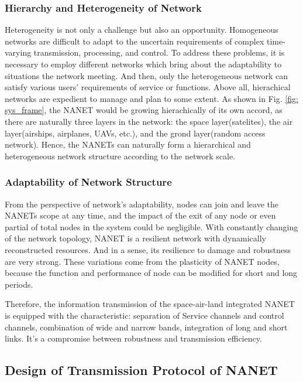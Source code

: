 \documentclass[journal,comsoc]{IEEEtran}
\begin{document}
			\subsubsection{Hierarchy and Heterogeneity of Network}
				Heterogeneity is not only a challenge but also an opportunity. 
				Homogeneous networks are difficult to adapt to the uncertain requirements of complex time-varying transmission, processing, and control.
				To address these problems, it is necessary to employ different networks which bring about the adaptability to situations the network meeting.	
				And then, only the heterogeneous network can satisfy various users' requirements of service or functions.
				Above all, hierachical networks are expedient to manage and plan to some extent.
				As shown in Fig. \ref{fig: sys_frame}, the NANET would be growing hierachically of its own accord, 
				as there are naturally three layers in the network: the space layer(satelites), the air layer(airships, airplanes, UAVs, etc.), and the grond layer(random access network).
				Hence, the NANETs can naturally form a hierarchical and heterogeneous network structure  according to the network scale.
				
			\subsubsection{Adaptability of Network Structure}
				
				From the perspective of network's adaptability, nodes can join and leave the NANETs scope at any time, 
				and the impact of the exit of any node or even partial of total nodes in the system could be negligible.
				With constantly changing of the network topology,  NANET is a resilient network with dynamically reconstructed resources.
				And in a sense, its resilience to damage and robustness are very strong.
				These variations come from the plasticity of NANET nodes, because the function and performance of node can be modified for short and long periods.
		
		Therefore, the information transmission of the space-air-land integrated NANET is equipped with the characteristic: separation of Service channels and control channels, combination of wide and narrow bands, integration of long and short links.
		It's a compromise between robustness and transmission efficiency.
		
		\subsection{Design of Transmission Protocol of NANET}
\end{document}
